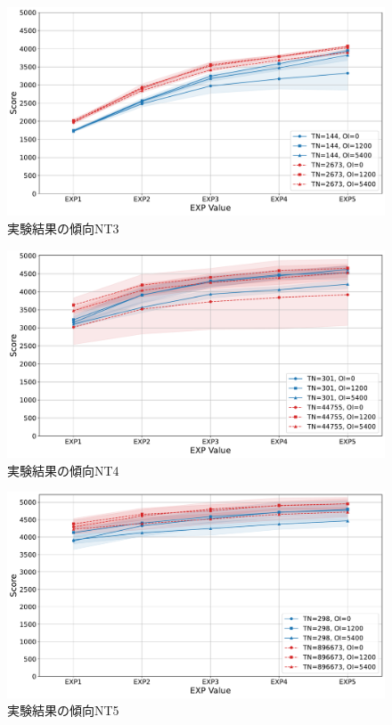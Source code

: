\begin{figure}[t]
    \centering
    \includegraphics[width=\linewidth]{pdf/exp_trends/combined_trends_NT3.pdf}
    \caption{実験結果の傾向NT3}
    \label{fig:exp_trendsNT3}
\end{figure}
\begin{figure}[t]
    \centering
    \includegraphics[width=\linewidth]{pdf/exp_trends/combined_trends_NT4.pdf}
    \caption{実験結果の傾向NT4}
    \label{fig:exp_trendsNT4}
\end{figure}
\begin{figure}[t]
    \centering
    \includegraphics[width=\linewidth]{pdf/exp_trends/combined_trends_NT5.pdf}
    \caption{実験結果の傾向NT5}
    \label{fig:exp_trendsNT5}
\end{figure}
